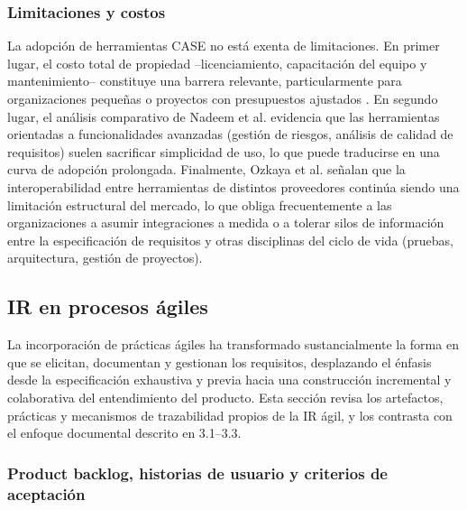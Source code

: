 \documentclass[journal,onecolumn]{IEEEtran}
\begin{document}
	\subsubsection{Limitaciones y costos}
	
	La adopción de herramientas CASE no está exenta de limitaciones. En primer lugar, el costo total de propiedad --licenciamiento, capacitación del equipo y mantenimiento-- constituye una barrera relevante, particularmente para organizaciones pequeñas o proyectos con presupuestos ajustados \cite{Bjarnason2023}. En segundo lugar, el análisis comparativo de Nadeem et al. \cite{Nadeem2022} evidencia que las herramientas orientadas a funcionalidades avanzadas (gestión de riesgos, análisis de calidad de requisitos) suelen sacrificar simplicidad de uso, lo que puede traducirse en una curva de adopción prolongada. Finalmente, Ozkaya et al. \cite{Ozkaya2023} señalan que la interoperabilidad entre herramientas de distintos proveedores continúa siendo una limitación estructural del mercado, lo que obliga frecuentemente a las organizaciones a asumir integraciones a medida o a tolerar silos de información entre la especificación de requisitos y otras disciplinas del ciclo de vida (pruebas, arquitectura, gestión de proyectos).
	
	\subsection{IR en procesos ágiles}
	
	La incorporación de prácticas ágiles ha transformado sustancialmente la forma en que se elicitan, documentan y gestionan los requisitos, desplazando el énfasis desde la especificación exhaustiva y previa hacia una construcción incremental y colaborativa del entendimiento del producto. Esta sección revisa los artefactos, prácticas y mecanismos de trazabilidad propios de la IR ágil, y los contrasta con el enfoque documental descrito en 3.1--3.3.
	
	\subsubsection{Product backlog, historias de usuario y criterios de aceptación}
	
\end{document}
